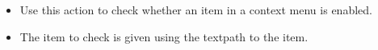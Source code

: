 
\begin{itemize}
\item Use this action to check whether an item in a context menu is enabled.
\item The item to check is given using the textpath to the item. 
\end{itemize}


